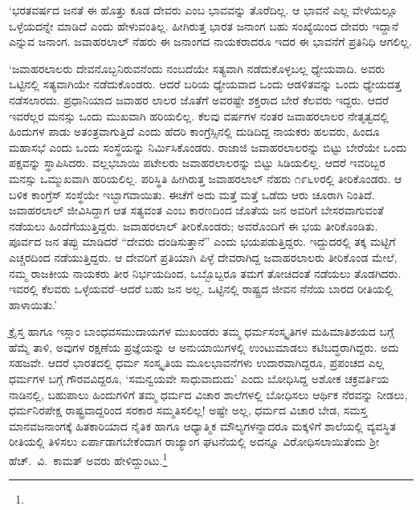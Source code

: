 ‘ಭರತವರ್ಷದ ಜನತೆ ಈ ಹೊತ್ತು ಕೂಡ ದೇವರು ಎಂಬ ಭಾವವನ್ನು ತೊರೆದಿಲ್ಲ. ಆ ಭಾವನೆ ಎಲ್ಲ ವೇಳೆಯಲ್ಲೂ ಒಳ್ಳೆಯದನ್ನೇ ಮಾಡಿದೆ ಎಂದು ಹೇಳುವಂತಿಲ್ಲ. ಹೀಗಿರುತ್ತ ಭಾರತ ಜನಾಂಗ ಬಹು ಸಂಖ್ಯೆಯಿಂದ ದೇವರು ಇದ್ದಾನೆ ಎನ್ನುವ ಜನಾಂಗ. ಜವಾಹರಲಾಲ್ ನೆಹರು ಈ ಜನಾಂಗದ ನಾಯಕರಾದರೂ ಇದರ ಈ ಭಾವನೆಗೆ ಪ್ರತಿನಿಧಿ ಆಗಲಿಲ್ಲ.

‘ಜವಾಹರಲಾಲರು ದೇವನೊಬ್ಬನಿರುವನೆಂದು ನಂಬದೆಯೇ ಸತ್ಯವಾಗಿ ನಡೆದುಕೊಳ್ಳಬಲ್ಲ ಧ್ಯೇಯವಾದಿ. ಅವರು ಒಟ್ಟಿನಲ್ಲಿ ಸತ್ಯವಾಗಿಯೇ ನಡೆದುಕೊಂಡರು. ಆದರೆ ಬರಿಯ ಧ್ಯೇಯವಾದ ಒಂದು ಆಡಳಿತವನ್ನು ಒಂದು ಧ್ಯೇಯದತ್ತ ನಡೆಸಲಾರದು. ಪ್ರಧಾನಿಯಾದ ಜವಾಹರ ಲಾಲರ ಜೊತೆಗೆ ಅವರಷ್ಟೇ ಶಕ್ತರಾದ ಬೇರೆ ಕೆಲವರು ಇದ್ದರು. ಆದರೆ ಇವರೆಲ್ಲರ ಮನಸ್ಸು ಒಂದು ಮುಖವಾಗಿ ಹರಿಯಲಿಲ್ಲ. ಕೆಲವು ವರ್ಷಗಳ ನಂತರ ಜವಾಹರಲಾಲರ ನೇತೃತ್ವದಲ್ಲಿ ಹಿಂದುಗಳ ಪಾಡು ಅತಂತ್ರವಾಗುತ್ತಿದೆ ಎಂದು ಹೆದರಿ ಕಾಂಗ್ರೆಸ್ಸಿನಲ್ಲಿ ದುಡಿದಿದ್ದ ನಾಯಕರು ಹಲವರು, ಹಿಂದೂ ಮಹಾಸಭೆ ಎಂದು ಒಂದು ಸಂಸ್ಥೆಯನ್ನು ನಿರ್ಮಿಸಿಕೊಂಡರು. ರಾಜಾಜಿ ಜವಾಹರಲಾಲರನ್ನು ಬಿಟ್ಟು ಬೇರೆಯೇ ಒಂದು ಪಕ್ಷವನ್ನು ಸ್ಥಾಪಿಸಿದರು. ವಲ್ಲಭಬಾಯಿ ಪಟೇಲರು ಜವಾಹರಲಾಲರನ್ನು ಬಿಟ್ಟು ಸಿಡಿಯಲಿಲ್ಲ. ಆದರೆ ಇವರಿಬ್ಬರ ಮನಸ್ಸು ಒಮ್ಮುಖವಾಗಿ ಹರಿಯಲಿಲ್ಲ. ಪರಿಸ್ಥಿತಿ ಹೀಗಿರುತ್ತ ಜವಾಹರಲಾಲ್ ನೆಹರು ೧೯೬೪ರಲ್ಲಿ ತೀರಿಕೊಂಡರು. ಆ ಬಳಿಕ ಕಾಂಗ್ರೆಸ್ ಸಂಸ್ಥೆಯೇ ಇಬ್ಭಾಗವಾಯಿತು. ಈಚೆಗೆ ಅದು ಮತ್ತೆ ಮತ್ತೆ ಒಡೆದು ಆರು ಚೂರಾಗಿ ನಿಂತಿದೆ. ಜವಾಹರಲಾಲ್ ಜೀವಿಸಿದ್ದಾಗ ಆತ ಸತ್ಯವಂತ ಎಂಬ ಕಾರಣದಿಂದ ಜೊತೆಯ ಜನ ಅವರಿಗೆ ಬೇಸರವಾಗುವಂತೆ ನಡೆಯಲು ಹಿಂದೆಗೆಯುತ್ತಿದ್ದರು. ಜವಾಹರಲಾಲ್ ತೀರಿಕೊಂಡರು; ಅವರೊಂದಿಗೆ ಈ ಭಯ ತೀರಿಕೊಂಡಿತು. ಪೂರ್ವದ ಜನ ತಪ್ಪು ಮಾಡಿದರೆ “ದೇವರು ದಂಡಿಸುತ್ತಾನೆ” ಎಂದು ಭಯಪಡುತ್ತಿದ್ದರು. ಇದ್ದುದರಲ್ಲಿ ತಕ್ಕ ಮಟ್ಟಿಗೆ ಎಚ್ಚರದಿಂದ ನಡೆಯುತ್ತಿದ್ದರು. ಆ ದೇವರಿಗೆ ಪ್ರತಿಯಾಗಿ ಪಿಳ್ಳೆ ದೇವರಾಗಿದ್ದ ಜವಾಹರಲಾಲರು ತೀರಿಕೊಂಡ ಮೇಲೆ, ನಮ್ಮ ರಾಜಕೀಯ ನಾಯಕರು ತೀರ ನಿರ್ಭಯದಿಂದ, ಒಬ್ಬೊಬ್ಬರೂ ತಮಗೆ ತೋಚಿದಂತೆ ನಡೆಯಲು ತೊಡಗಿದರು. ಇವರಲ್ಲಿ ಕೆಲವರು ಒಳ್ಳೆಯವರೆ–ಆದರೆ ಬಹು ಜನ ಅಲ್ಲ. ಒಟ್ಟಿನಲ್ಲಿ ರಾಷ್ಟ್ರದ ಜೀವನ ನೆನೆಯ ಬಾರದ ರೀತಿಯಲ್ಲಿ ಹಾಳಾಯಿತು.’

ಕ್ರೈಸ್ತ ಹಾಗೂ ಇಸ್ಲಾಂ ಬಾಂಧವಸಮುದಾಯಗಳ ಮುಖಂಡರು ತಮ್ಮ ಧರ್ಮಸಂಸ್ಕೃತಿಗಳ ಮಹಿಮಾತಿಶಯದ ಬಗ್ಗೆ ಹೆಮ್ಮೆ ತಾಳಿ, ಅವುಗಳ ರಕ್ಷಣೆಯ ಪ್ರಜ್ಞೆಯನ್ನು ಆ ಅನುಯಾಯಿಗಳಲ್ಲಿ ಉಂಟುಮಾಡಲು ಕಟಿಬದ್ಧರಾಗಿದ್ದರು. ಅದು ಸಹಜವೇ. ಆದರೆ ಭಾರತದಲ್ಲಿ ಧರ್ಮ ಸಂಸ್ಕೃತಿಯ ಮೂಲಭಾವನೆಗಳು ಉದಾರವಾಗಿದ್ದರೂ, ಪ್ರಪಂಚದ ಎಲ್ಲ ಧರ್ಮಗಳ ಬಗ್ಗೆ ಗೌರವವಿದ್ದರೂ, ‘ಸಮನ್ವಯವೇ ಸಾಧುವಾದುದು’ ಎಂದು ಬೋಧಿಸಿದ್ದ ಅಶೋಕ ಚಕ್ರವರ್ತಿಯ ನಾಡಿನಲ್ಲಿ, ಬಹುಪಾಲು ಹಿಂದುಗಳಿಗೆ ತಮ್ಮ ಧರ್ಮದ ವಿಚಾರ ಶಾಲೆಗಳಲ್ಲಿ ಬೋಧಿಸಲು ಆರ್ಥಿಕ ನೆರವನ್ನು ನೀಡಲು, ಧರ್ಮನಿರಪೇಕ್ಷ ರಾಷ್ಟ್ರವಾದ್ದರಿಂದ ಸರಕಾರ ಸಮ್ಮತಿಸಲಿಲ್ಲ! ಅಷ್ಟೇ ಅಲ್ಲ, ಧರ್ಮದ ವಿಚಾರ ಬೇಡ, ಸಮಸ್ತ ಮಾನವಜನಾಂಗಕ್ಕೆ ಹಿತಕಾರಿಯಾದ ನೈತಿಕ ಹಾಗೂ ಆಧ್ಯಾತ್ಮಿಕ ಮೌಲ್ಯಗಳನ್ನಾದರೂ ಮಕ್ಕಳಿಗೆ ಶಾಲೆಯಲ್ಲಿ ವ್ಯವಸ್ಥಿತ ರೀತಿಯಲ್ಲಿ ತಿಳಿಸಲು ಏರ್ಪಾಡಾಗಬೇಕೆಂದಾಗ ರಾಜ್ಯಾಂಗ ಘಟನೆಯಲ್ಲಿ ಅದನ್ನೂ ವಿರೋಧಿಸಲಾಯಿತೆಂದು ಶ‍್ರೀ ಹೆಚ್.\ ವಿ.\ ಕಾಮತ್ ಅವರು ಹೇಳಿದ್ದುಂಟು.\footnote{\hfill{}}

